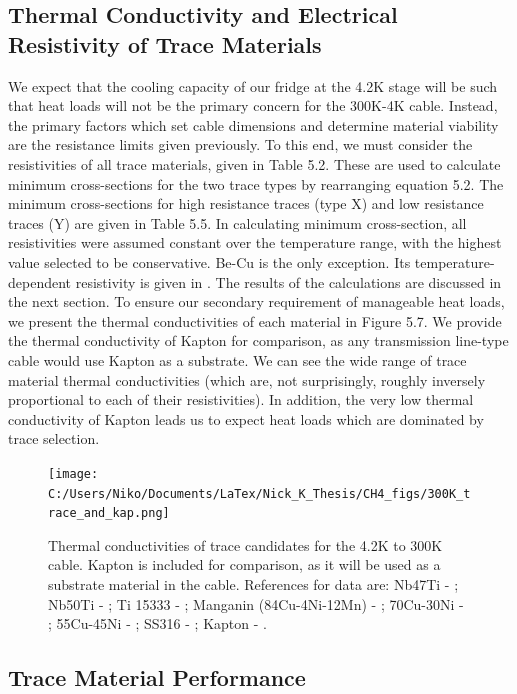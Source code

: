 \documentclass{report}
\begin{document}
\subsection{Thermal Conductivity and Electrical Resistivity of Trace Materials}

We expect that the cooling capacity of our fridge at the 4.2K stage will be such that heat loads will not be the primary concern for the 300K-4K cable. Instead, the primary factors which set cable dimensions and determine material viability are the resistance limits given previously. To this end, we must consider the resistivities of all trace materials, given in Table 5.2. These are used to calculate minimum cross-sections for the two trace types by rearranging equation 5.2. The minimum cross-sections for high resistance traces (type X) and low resistance traces (Y) are given in Table 5.5. In calculating minimum cross-section, all resistivities were assumed constant over the temperature range, with the highest value selected to be conservative. Be-Cu is the only exception. Its temperature-dependent resistivity is given in \cite{Sciver1986}. The results of the calculations are discussed in the next section.
To ensure our secondary requirement of manageable heat loads, we present the thermal conductivities of each material in  Figure 5.7. We provide the thermal conductivity of Kapton for comparison, as any transmission line-type cable would use Kapton as a substrate. We can see the wide range of trace material thermal conductivities (which are, not surprisingly, roughly inversely proportional to each of their resistivities). In addition, the very low thermal conductivity of Kapton leads us to expect heat loads which are dominated by trace selection.

\begin{figure}[ht]
\centering
\texttt{[image: C:/Users/Niko/Documents/LaTex/Nick\_K\_Thesis/CH4\_figs/300K\_trace\_and\_kap.png]}
\caption{Thermal conductivities of trace candidates for the 4.2K to 300K cable. Kapton is included for comparison, as it will be used as a substrate material in the cable. References for data are: Nb47Ti - \cite{Blake} ; Nb50Ti - \cite{Flachbart1978} ; Ti 15333 - \cite{Canavan2006} ; Manganin (84Cu-4Ni-12Mn) - \cite{tou} ; 70Cu-30Ni - \cite{Blake} ; 55Cu-45Ni - \cite{tou} ; SS316 - \cite{ss316_nist} ; Kapton - \cite{Rule1996}.}
\end{figure}

\subsection{Trace Material Performance}
\end{document}
